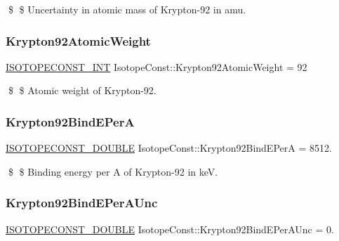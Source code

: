 \$ \$ Uncertainty in atomic mass of Krypton-\/92 in amu. \mbox{\label{group___isotope_const-_krypton-_kr92_ga316f066fca52fdb4dbb0df15f0200b07}} 
\subsubsection{\texorpdfstring{Krypton92\+Atomic\+Weight}{Krypton92AtomicWeight}}
{\footnotesize\ttfamily \mbox{\hyperlink{group___isotope_const-_macros_ga5f18360b3e99483a35c32d789e62621c}{I\+S\+O\+T\+O\+P\+E\+C\+O\+N\+S\+T\+\_\+\+I\+NT}} Isotope\+Const\+::\+Krypton92\+Atomic\+Weight = 92}

\$ \$ Atomic weight of Krypton-\/92. \mbox{\label{group___isotope_const-_krypton-_kr92_ga25223e629a3279fbef6d118839b15867}} 
\subsubsection{\texorpdfstring{Krypton92\+Bind\+E\+PerA}{Krypton92BindEPerA}}
{\footnotesize\ttfamily \mbox{\hyperlink{group___isotope_const-_macros_ga8f45a7272ce02c0b4c65c44636ed719a}{I\+S\+O\+T\+O\+P\+E\+C\+O\+N\+S\+T\+\_\+\+D\+O\+U\+B\+LE}} Isotope\+Const\+::\+Krypton92\+Bind\+E\+PerA = 8512.}

\$ \$ Binding energy per A of Krypton-\/92 in keV. \mbox{\label{group___isotope_const-_krypton-_kr92_ga7632efdf4d8cbb4208303e9e49834139}} 
\subsubsection{\texorpdfstring{Krypton92\+Bind\+E\+Per\+A\+Unc}{Krypton92BindEPerAUnc}}
{\footnotesize\ttfamily \mbox{\hyperlink{group___isotope_const-_macros_ga8f45a7272ce02c0b4c65c44636ed719a}{I\+S\+O\+T\+O\+P\+E\+C\+O\+N\+S\+T\+\_\+\+D\+O\+U\+B\+LE}} Isotope\+Const\+::\+Krypton92\+Bind\+E\+Per\+A\+Unc = 0.}

